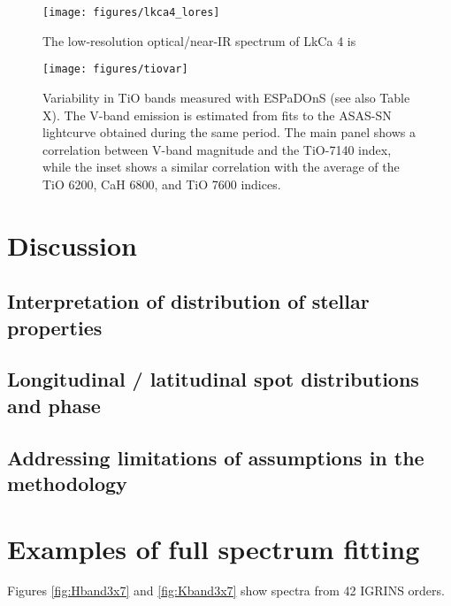 \documentclass[onecolumn]{emulateapj}%
\begin{document}
\begin{figure*}
	\centering
	\texttt{[image: figures/lkca4\_lores]} 
	\vspace{-100mm}
	\caption{The low-resolution optical/near-IR spectrum of LkCa 4 is }
	\label{fig:lores}
\end{figure*}



\begin{figure*}
	\centering
	\texttt{[image: figures/tiovar]} 
	\vspace{-100mm}
	\caption{Variability in TiO bands measured with ESPaDOnS (see also Table X).  The V-band emission is estimated from fits to the ASAS-SN lightcurve obtained during the same period.  The main panel shows a correlation between V-band magnitude and the TiO-7140 index, while the inset shows a similar correlation with the average of the TiO 6200, CaH 6800, and TiO 7600 indices.}
	\label{fig:tiovar}
\end{figure*}




\section{Discussion}


\subsection{Interpretation of distribution of stellar properties}

\subsection{Longitudinal / latitudinal spot distributions and phase}

\subsection{Addressing limitations of assumptions in the methodology}



\appendix

\section{Examples of full spectrum fitting}

Figures \ref{fig:Hband3x7} and \ref{fig:Kband3x7} show spectra from 42 IGRINS orders.
\end{document}
